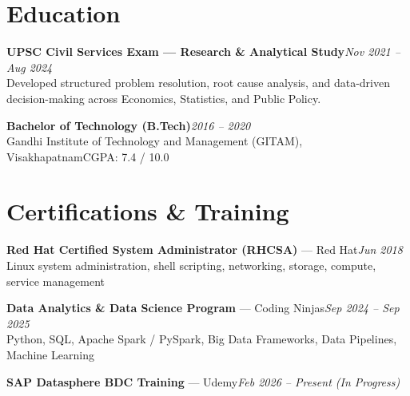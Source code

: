 \documentclass[10pt, letterpaper]{article}
\begin{document}
\section{Education}

{\bfseries UPSC Civil Services Exam — Research \& Analytical Study}\hfill{\small\color{muted}\textit{Nov 2021 -- Aug 2024}}\\
{\small\color{muted}Developed structured problem resolution, root cause analysis, and data-driven decision-making across Economics, Statistics, and Public Policy.}

\vspace{2pt}
{\bfseries Bachelor of Technology (B.Tech)}\hfill{\small\color{muted}\textit{2016 -- 2020}}\\
{\small\color{muted}Gandhi Institute of Technology and Management (GITAM), Visakhapatnam\hfill CGPA: 7.4 / 10.0}

\section{Certifications \& Training}

{\bfseries Red Hat Certified System Administrator (RHCSA)} — Red Hat\hfill{\small\color{muted}\textit{Jun 2018}}\\
{\small\color{muted}Linux system administration, shell scripting, networking, storage, compute, service management}

\vspace{1pt}
{\bfseries Data Analytics \& Data Science Program} — Coding Ninjas\hfill{\small\color{muted}\textit{Sep 2024 -- Sep 2025}}\\
{\small\color{muted}Python, SQL, Apache Spark / PySpark, Big Data Frameworks, Data Pipelines, Machine Learning}

\vspace{1pt}
{\bfseries SAP Datasphere BDC Training} — Udemy\hfill{\small\color{muted}\textit{Feb 2026 -- Present \emph{(In Progress)}}}

\end{document}
